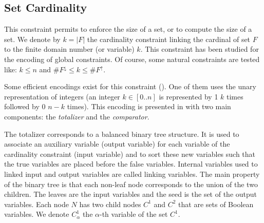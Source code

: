 \documentclass[3p,authoryear,times]{elsarticle}
\newcommand{\MS}[1]{{{#1}^{\uparrow}}}
\newcommand{\MSF}[0]{\MS{F}}
\newcommand{\MC}[1]{{\#{#1}^\uparrow{}}}
\newcommand{\mc}[1]{{\#{#1}^\downarrow}}
\newcommand{\MCF}[0]{\MC{F}{}}
\newcommand{\mcF}[0]{\mc{F}{}}
\begin{document}
\color{black}

\subsection{Set Cardinality}

This constraint permits to enforce the size of a set, or to compute the size of a set.
We denote by $k=|F|$ the cardinality constraint linking the cardinal of set $F$ to the finite domain number (or variable) $k$. This constraint has been studied for the encoding of global constraints. Of course, some natural constraints are tested like: $k\leq n$ and $\mcF \leq k \leq \MCF$.
% 
%

Some efficient encodings exist for this constraint (\cite{Bailleux03,Abio2013,Abio2015}). One of them uses the unary representation of integers (an integer $k \in[0..n]$ is represented by 1 $k$ times followed by 0 $n-k$ times). This encoding is presented in \cite{Bailleux03} with two main components: the \textit{totalizer} and the \textit{comparator}.
 
 The totalizer corresponds to a balanced binary tree structure. It is used to associate an auxiliary variable (output variable) for each variable of the cardinality constraint (input variable) and to sort these new variables such that the true variables are placed before the false variables. Internal variables used to linked input and output variables are called  linking variables. The main property of the binary tree is that each non-leaf node corresponds to the union of the two children. The leaves are the input variables and the seed is the set of the output variables. Each node $N$  has two child nodes $C^1$ and $C^2$ that are sets of Boolean variables. We denote $C^1_\alpha$ the $\alpha$-th variable of the set $C^1$. 
\end{document}
